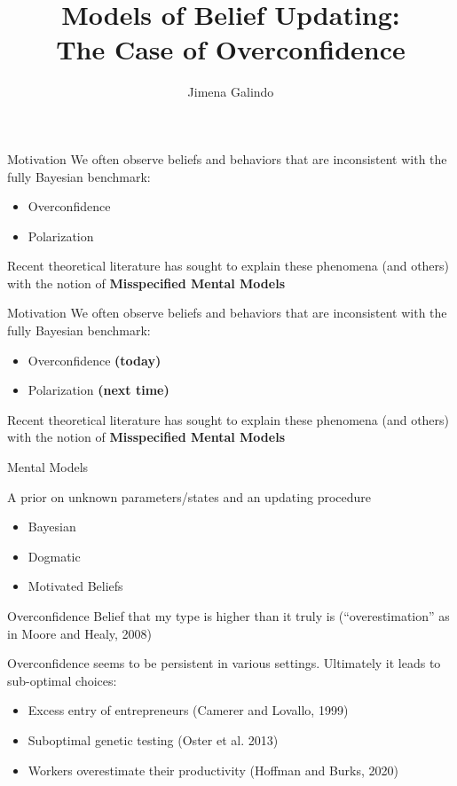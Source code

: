 \documentclass[aspectratio=169]{beamer}
\title{Models of Belief Updating:\\ The Case of Overconfidence}
\author{Jimena Galindo}
\begin{document}
\frame{\titlepage}

\begin{frame}{Motivation}
    We often observe beliefs and behaviors that are inconsistent with the fully Bayesian benchmark:\\
    \bigskip
    \begin{itemize} 
        \item Overconfidence  
        \item Polarization 
    \end{itemize}
   
    \bigskip
    Recent theoretical literature has sought to explain these phenomena (and others) with the notion of \bf{Misspecified Mental Models}
\end{frame}

\begin{frame}{Motivation}
    We often observe beliefs and behaviors that are inconsistent with the fully Bayesian benchmark:\\
    \bigskip
    \begin{itemize} 
        \item Overconfidence \textbf{(today)}  
        \item Polarization \textbf{(next time)}
    \end{itemize}
   
    \bigskip
    Recent theoretical literature has sought to explain these phenomena (and others) with the notion of \bf{Misspecified Mental Models}
\end{frame}

\begin{frame}{Mental Models}

A prior on unknown parameters/states and an updating procedure\\
\bigskip
\begin{itemize}
    \item Bayesian 
    \item Dogmatic 
    \item Motivated Beliefs
\end{itemize}
    
\end{frame}

\begin{frame}{Overconfidence}
    Belief that my type is higher than it truly is (``overestimation'' as in Moore and Healy, 2008)\\
    \bigskip
    
    Overconfidence seems to be persistent in various settings. Ultimately it leads to sub-optimal choices:
    \begin{itemize} 
        \item Excess entry of entrepreneurs (Camerer and Lovallo, 1999)
        \item Suboptimal genetic testing (Oster et al. 2013)
        \item  Workers overestimate their productivity (Hoffman and Burks, 2020)
    \end{itemize}
    
\end{frame}
\end{document}
